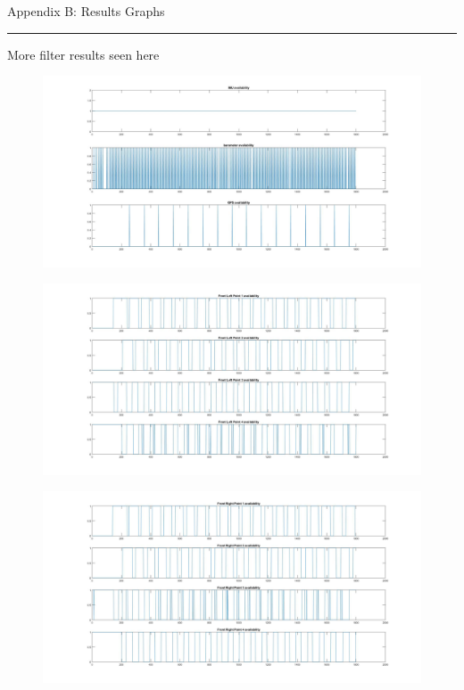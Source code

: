 \pagestyle{plain}


{\Large Appendix B: Results Graphs}
\vskip 5mm
\hrule
\vskip 5mm


More filter results seen here
\newpage
\begin{figure}[H]\captionsetup{width=0.5\linewidth, font=small}  
\includegraphics[height=0.5\textheight, angle=90]{figures/sav.JPG}
\label{fig:sav}
\end{figure}
\newpage
\begin{figure}[H]\captionsetup{width=0.5\linewidth, font=small}  
\includegraphics[height=0.5\textheight, angle=90]{figures/flav.JPG}
\label{fig:flav}
\end{figure}
\newpage
\begin{figure}[H]\captionsetup{width=0.5\linewidth, font=small}  
\includegraphics[height=0.5\textheight, angle=90]{figures/frav.JPG}
\label{fig:frav}
\end{figure}

